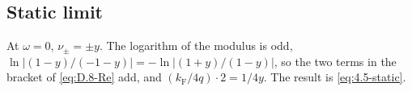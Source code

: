 \subsection*{Static limit}

At $\omega = 0$, $\nu_\pm = \pm y$. The logarithm of the modulus is odd, $\ln|(1 - y)/(-1 - y)| = -\ln|(1 + y)/(1 - y)|$, so the two terms in the bracket of \cref{eq:D.8-Re} add, and $(k_{\mathrm{F}}/4q)\cdot2 = 1/4y$. The result is \cref{eq:4.5-static}.
